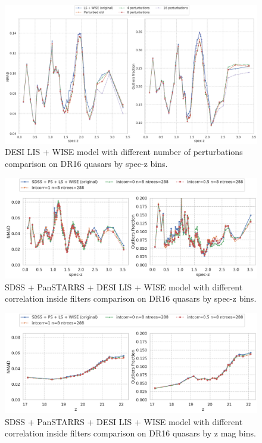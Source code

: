 \begin{figure}
    \centering
    \includegraphics[width=\linewidth]{images/perturbations-22-zspec.png}
    \caption{DESI LIS + WISE model with different number of perturbations comparison on DR16 quasars by spec-z bins.}
    \label{fig:perturbations_22_zspec}
\end{figure}

\begin{figure}
    \centering
    \includegraphics[width=\linewidth]{images/perturbations-intcorr-35-zspec.png}
    \caption{SDSS + PanSTARRS + DESI LIS + WISE model with different correlation inside filters comparison on DR16 quasars by spec-z bins.}
    \label{fig:perturbations_intcorr_35_zspec}
\end{figure}

\begin{figure}
    \centering
    \includegraphics[width=\linewidth]{images/perturbations-intcorr-35-z.png}
    \caption{SDSS + PanSTARRS + DESI LIS + WISE model with different correlation inside filters comparison on DR16 quasars by z mag bins.}
    \label{fig:perturbations_intcorr_35_z}
\end{figure}

